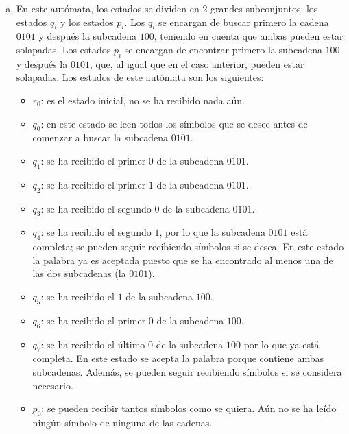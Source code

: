 \documentclass[11pt,a4paper]{article}
\begin{document}
\begin{enumerate}[a)]
\begin{figure}[H]
		\end{figure}
		\item En este autómata, los estados se dividen en 2 grandes subconjuntos: los estados $q_i$ y los estados $p_i$. Los $q_i$ se encargan de buscar primero la cadena $0101$ y después la subcadena $100$, teniendo en cuenta que ambas pueden estar solapadas. Los estados $p_i$ se encargan de encontrar primero la subcadena $100$ y después la $0101$, que, al igual que en el caso anterior, pueden estar solapadas. Los estados de este autómata son los siguientes:
		\begin{itemize}
			\item $r_0$: es el estado inicial, no se ha recibido nada aún.
			\item $q_0$: en este estado se leen todos los símbolos que se desee antes de comenzar a buscar la subcadena $0101$.
			\item $q_1$: se ha recibido el primer $0$ de la subcadena $0101$.
			\item $q_2$: se ha recibido el primer $1$ de la subcadena $0101$.
			\item $q_3$: se ha recibido el segundo $0$ de la subcadena $0101$.
			\item $q_4$: se ha recibido el segundo $1$, por lo que la subcadena $0101$ está completa; se pueden seguir recibiendo símbolos si se desea. En este estado la palabra ya es aceptada puesto que se ha encontrado al menos una de las dos subcadenas (la $0101$).
			\item $q_5$: se ha recibido el $1$ de la subcadena $100$.
			\item $q_6$: se ha recibido el primer $0$ de la subcadena $100$.
			\item $q_7$: se ha recibido el último $0$ de la subcadena $100$ por lo que ya está completa. En este estado se acepta la palabra porque contiene ambas subcadenas. Además, se pueden seguir recibiendo símbolos si se considera necesario.
			\item $p_0$: se pueden recibir tantos símbolos como se quiera. Aún no se ha leído ningún símbolo de ninguna de las cadenas.

\end{itemize}
\end{enumerate}
\end{document}
